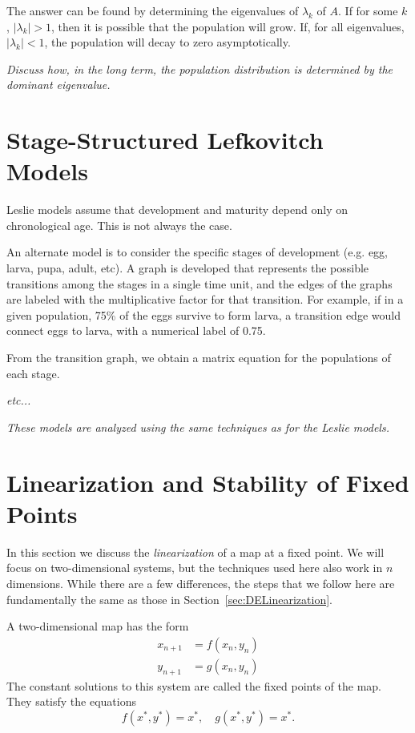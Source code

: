 \documentclass[reqno]{immbook}
\numberwithin{equation}{chapter}
\numberwithin{question}{section}
\numberwithin{theorem}{chapter}
\numberwithin{figure}{chapter}
\theoremstyle{definition}
\begin{document}
The answer can be found by determining the eigenvalues
of $\lambda_k$ of $A$.
If for some $k$,  $|\lambda_k| > 1$, then it is possible
that the population will grow.  If, for all eigenvalues,
$|\lambda_k| < 1$, the population will decay to zero
asymptotically.

\medskip
\noindent
\emph{Discuss how, in the long term, the population
distribution is determined by the dominant eigenvalue.}

\section{Stage-Structured Lefkovitch Models}
Leslie models assume that development and maturity
depend only on chronological age.  This is not always
the case.

An alternate model is to consider the specific stages
of development (e.g. egg, larva, pupa, adult, etc).
A graph is developed that represents the possible transitions
among the stages in a single time unit, and the edges
of the graphs are labeled with the multiplicative
factor for that transition.  For example, if in a given
population, 75\% of the eggs survive to form larva,
a transition edge would connect eggs to larva, with
a numerical label of 0.75.

From the transition graph, we obtain a matrix equation
for the populations of each stage.

\emph{etc...}

\noindent
\emph{These models are analyzed using the same techniques
as for the Leslie models.}

\section{Linearization and Stability of Fixed Points}
%
In this section we discuss the \emph{linearization}
of a map at a fixed point. 
We will focus on two-dimensional systems, but the
techniques used here also work in $n$ dimensions.
While there are a few differences, the steps that
we follow here are fundamentally the same as those
in Section~\ref{sec:DELinearization}.

A two-dimensional map has the form
\begin{equation}
\begin{split}
  x_{n+1} & = f(x_n,y_n) \\
  y_{n+1} & = g(x_n,y_n)
\end{split}
\label{eqn:map}
\end{equation}
The constant solutions to this system are called the fixed points
of the map.
They satisfy the equations
\begin{equation}
    f(x^*,y^*) = x^*, \quad g(x^*,y^*) = x^*.
\end{equation}
\end{document}
